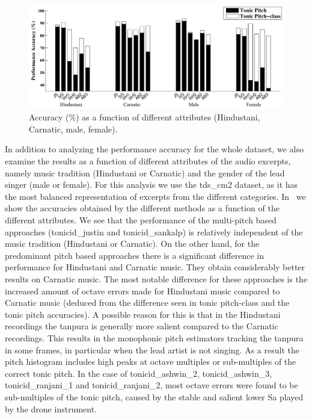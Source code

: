 {{\begin{figure}
	\begin{center}
		\includegraphics[width=\figSizeHundred]{ch05_preprocessing/figures/Category_Performance.pdf}
	\end{center}
	\caption{Accuracy (\%) as a function of different attributes
		(Hindustani, Carnatic, male, female).}
	\label{fig:tonic_id_categorywise_performance}
\end{figure}

In addition to analyzing the performance accuracy for the whole dataset, we also examine the results as a function of different attributes of
the audio excerpts, namely music tradition (Hindustani or Carnatic) and the gender of the lead singer (male or female). For this analysis we use the \acrshort{tds_cm2} dataset, as it has the most balanced representation of excerpts from the different categories. In~ we show the accuracies obtained by the different methods as a function of the different attributes. We see that the performance of the multi-pitch based approaches (\acrshort{tonicid_justin} and \acrshort{tonicid_sankalp}) is relatively independent of the music tradition (Hindustani or Carnatic). On the other hand, for the predominant pitch based approaches there is a significant difference in performance for Hindustani and Carnatic music. They obtain considerably better results on Carnatic music. The most notable difference for these approaches is the increased amount of octave errors made for Hindustani music compared to Carnatic music (deduced from the difference seen in tonic pitch-class and the tonic pitch accuracies). A possible reason for this is that in the Hindustani recordings the \gls{tanpura} is generally more salient compared to the Carnatic recordings. This results in the monophonic pitch estimators tracking the \gls{tanpura} in some frames, in particular when the lead artist is not singing. As a result the pitch histogram includes high peaks at octave multiples or sub-multiples of the correct tonic pitch. In the case of \acrshort{tonicid_ashwin_2}, \acrshort{tonicid_ashwin_3}, \acrshort{tonicid_ranjani_1} and \acrshort{tonicid_ranjani_2}, most octave errors were found to be sub-multiples of the tonic pitch, caused by the stable and salient lower Sa played by the drone instrument.

}}

